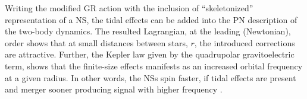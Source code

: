 %
Writing the modified \ac{GR} action with the inclusion of ``skeletonized'' representation
of a \ac{NS}, the tidal effects can be added into the \ac{PN} description of the two-body dynamics.
The resulted Lagrangian, at the leading (Newtonian), order shows that at small distances 
between stars, $r$, the introduced corrections are attractive. 
%
Further, the Kepler law given by the quadrupolar gravitoelectric term, 
%
%
shows that the finite-size effects manifests as an increased orbital frequency at a given radius.
In other words, the \acp{NS} spin faster, if tidal effects are present and merger sooner 
producing signal with higher frequency \cite{29}. 
%

